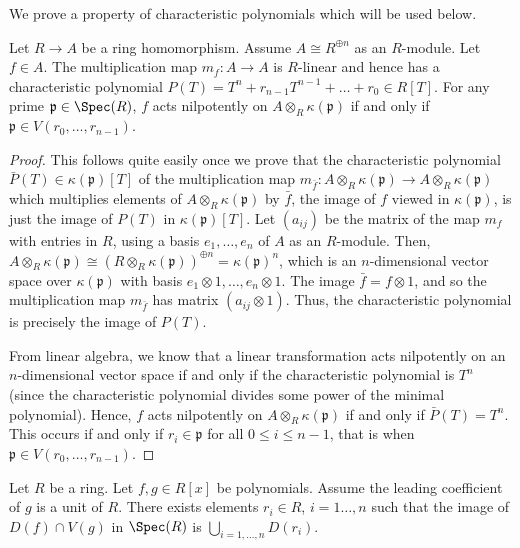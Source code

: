 \noindent
We prove a property of characteristic polynomials which
will be used below.

\begin{lemma}
\label{lemma-characteristic-polynomial-prime}
Let $R \to A$ be a ring homomorphism.
Assume $A \cong R^{\oplus n}$ as an $R$-module.
Let $f \in A$. The multiplication map $m_f: A
\to A$ is $R$-linear and hence
has a characteristic polynomial
$P(T) = T^n + r_{n-1}T^{n-1} + \ldots + r_0 \in R[T]$.
For any prime
$\mathfrak{p} \in \Spec(R)$, $f$ acts nilpotently on $A
\otimes_R \kappa(\mathfrak{p})$ if and only if $\mathfrak p \in
V(r_0, \ldots, r_{n-1})$.
\end{lemma}

\begin{proof}
This follows quite easily once we prove that the characteristic
polynomial $\bar P(T) \in \kappa(\mathfrak p)[T]$ of the
multiplication map $m_{\bar f}: A \otimes_R \kappa(\mathfrak p) \to
A \otimes_R \kappa(\mathfrak p)$ which multiplies elements of $A
\otimes_R \kappa(\mathfrak p)$ by $\bar f$, the image of $f$ viewed in
$\kappa(\mathfrak p)$, is just the image of $P(T)$ in
$\kappa(\mathfrak p)[T]$. Let $(a_{ij})$ be the matrix of the map
$m_f$ with entries in $R$, using a basis $e_1, \ldots, e_n$
of $A$ as an $R$-module.
Then, $A \otimes_R \kappa(\mathfrak p) \cong (R \otimes_R
\kappa(\mathfrak p))^{\oplus n} = \kappa(\mathfrak p)^n$, which is
an $n$-dimensional vector space over $\kappa(\mathfrak p)$ with
basis $e_1 \otimes 1, \ldots, e_n \otimes 1$. The image $\bar f = f
\otimes 1$, and so the multiplication map $m_{\bar f}$ has matrix
$(a_{ij} \otimes 1)$. Thus, the characteristic polynomial is
precisely the image of $P(T)$.

\medskip\noindent
From linear algebra, we know that a linear transformation acts
nilpotently on an $n$-dimensional vector space if and only if the
characteristic polynomial is $T^n$ (since the characteristic
polynomial divides some power of the minimal polynomial). Hence,
$f$ acts nilpotently on $A \otimes_R \kappa(\mathfrak p)$ if and
only if $\bar P(T) = T^n$. This occurs if and only if $r_i \in
\mathfrak p$ for all $0 \leq i \leq n - 1$, that is when $\mathfrak p \in
V(r_0, \ldots, r_{n - 1}).$
\end{proof}

\begin{lemma}
\label{lemma-affineline-special}
Let $R$ be a ring. Let $f, g \in R[x]$ be polynomials.
Assume the leading coefficient of $g$ is a unit of $R$.
There exists elements $r_i\in R$, $i = 1\ldots, n$ such that
the image of $D(f) \cap V(g)$ in $\Spec(R)$ is
$\bigcup_{i = 1, \ldots, n} D(r_i)$.
\end{lemma}

